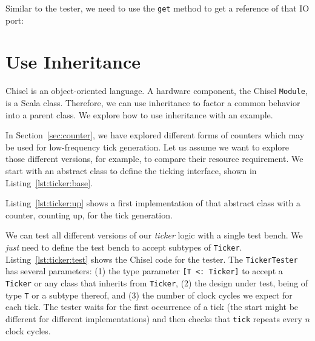\documentclass[%
    10pt,
    headinclude, footexclude,
    openright, %
    notitlepage,
    cleardoubleempty,
    headsepline,
    pointlessnumbers,
    bibtotoc, idxtotoc,
    ]{scrbook}
\newcommand{\code}[1]{{\lstinline[basicstyle=\small\ttfamily]{#1}}}
\begin{document}

Similar to the tester, we need to  use the \code{get} method to get a reference
of that IO port:



\section{Use Inheritance}
\label{sec:inheritance}


Chisel is an object-oriented language. A hardware component, the Chisel \code{Module},
is a Scala class. Therefore, we can use inheritance to factor a common behavior
into a parent class. We explore how to use inheritance with an example.

In Section~\ref{sec:counter}, we have explored different forms of counters
which may be used for low-frequency tick generation. Let us assume we want to
explore those different versions, for example, to compare their resource requirement.
We start with an abstract class to define the ticking interface, shown in Listing~\ref{lst:ticker:base}.


\noindent Listing~\ref{lst:ticker:up} shows a first implementation of that abstract class
with a counter, counting up, for the tick generation.


We can test all different versions of our \emph{ticker} logic with a single test bench.
We \emph{just} need to define the test bench to accept subtypes of \code{Ticker}.
Listing~\ref{lst:ticker:test} shows the Chisel code for the tester.
The \code{TickerTester} has several parameters: (1) the type parameter
\code{[T <: Ticker]} to accept a \code{Ticker} or any class that inherits from \code{Ticker},
(2) the design under test, being of type \code{T} or a subtype thereof,
and (3) the number of clock cycles we expect for each tick.
The tester waits for the first occurrence of a tick (the start might be different for
different implementations) and then checks that \code{tick} repeats every $n$ clock cycles.

\end{document}
